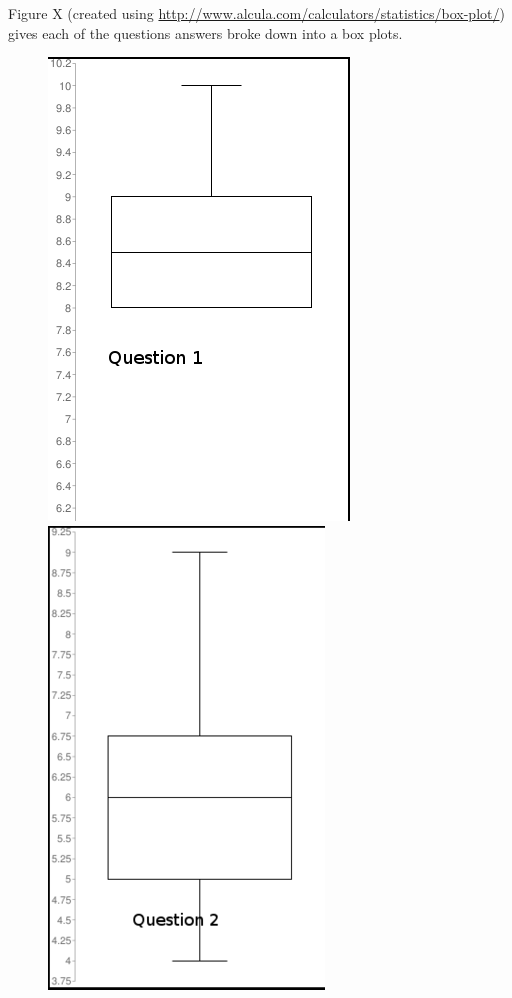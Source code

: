 Figure X (created using \url{http://www.alcula.com/calculators/statistics/box-plot/}) gives each of the questions answers broke down into a box plots.
\begin{center}
\begin{figure}[H]
\includegraphics[scale=0.45]{images/q1}
\includegraphics[scale=0.45]{images/q2}

\end{figure}
\end{center}
